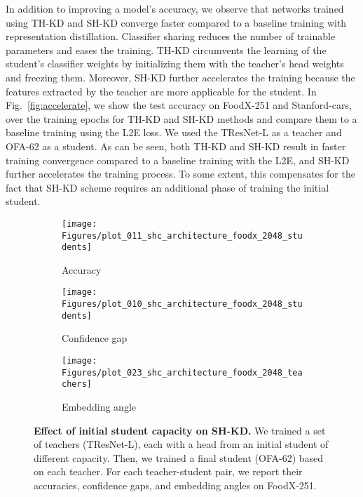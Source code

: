 In addition to improving a model's accuracy, we observe that networks trained using TH-KD and SH-KD converge faster compared to a baseline training with representation distillation. Classifier sharing reduces the number of trainable parameters and eases the training. TH-KD circumvents the learning of the student's classifier weights by initializing them with the teacher's head weights and freezing them. Moreover, SH-KD further accelerates the training because the features extracted by the teacher are more applicable for the student.
In Fig.~\ref{fig:accelerate}, we show the test accuracy on FoodX-251 and Stanford-cars, over the training epochs for TH-KD and SH-KD methods and compare them to a baseline training using the L2E loss. We used the TResNet-L as a teacher and OFA-62 as a student. As can be seen, both TH-KD and SH-KD result in faster training convergence compared to a baseline training with the L2E, and SH-KD further accelerates the training process.
To some extent, this compensates for the fact that SH-KD scheme requires an additional phase of training the initial student.

\begin{figure}[t!]
\begin{subfigure}[a]{0.33\textwidth}
  \centering
  \texttt{[image: Figures/plot\_011\_shc\_architecture\_foodx\_2048\_students]}
  \caption{Accuracy}
  \label{subfig:shc_acc}
\end{subfigure}\hfill \begin{subfigure}[h]{0.33\textwidth}
  \centering
  \texttt{[image: Figures/plot\_010\_shc\_architecture\_foodx\_2048\_students]}
  \caption{Confidence gap}
  \label{subfig:shc_conf}
\end{subfigure}\hfill \begin{subfigure}[h]{0.33\textwidth}
  \centering
  \texttt{[image: Figures/plot\_023\_shc\_architecture\_foodx\_2048\_teachers]}
  \caption{Embedding angle}
  \label{subfig:shc_angle}
\end{subfigure}
\caption{\textbf{Effect of initial student capacity on SH-KD.} 
We trained a set of teachers (TResNet-L), each with a head from an initial student of different capacity.  Then, we trained a final student (OFA-62) based on each teacher.
For each teacher-student pair, we report their accuracies, confidence gaps, and embedding angles on FoodX-251.}
\label{fig:shc_ablation}
\vspace{-5mm}
\end{figure}

